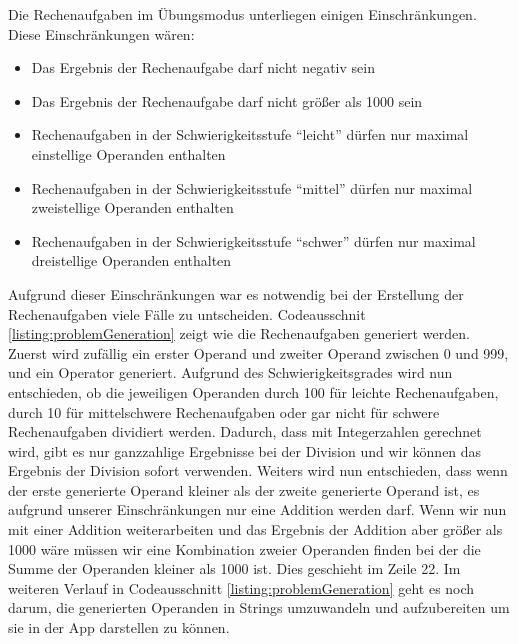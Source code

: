 Die Rechenaufgaben im Übungsmodus unterliegen einigen Einschränkungen. Diese Einschränkungen wären:
\begin{itemize}
\item Das Ergebnis der Rechenaufgabe darf nicht negativ sein
\item Das Ergebnis der Rechenaufgabe darf nicht größer als 1000 sein
\item Rechenaufgaben in der Schwierigkeitsstufe \enquote{leicht} dürfen nur maximal einstellige Operanden enthalten
\item Rechenaufgaben in der Schwierigkeitsstufe \enquote{mittel} dürfen nur maximal zweistellige Operanden enthalten
\item Rechenaufgaben in der Schwierigkeitsstufe \enquote{schwer} dürfen nur maximal dreistellige Operanden enthalten
\end{itemize}
Aufgrund dieser Einschränkungen war es notwendig bei der Erstellung der Rechenaufgaben viele 
Fälle zu untscheiden. Codeausschnit \ref{listing:problemGeneration} zeigt wie die Rechenaufgaben
generiert werden.
Zuerst wird zufällig ein erster Operand und zweiter Operand zwischen 0 und 999, und ein Operator 
generiert. Aufgrund des Schwierigkeitsgrades wird nun entschieden, ob die jeweiligen Operanden durch
100 für leichte Rechenaufgaben, durch 10 für mittelschwere Rechenaufgaben oder gar nicht für schwere
Rechenaufgaben dividiert werden. Dadurch, dass mit Integerzahlen gerechnet wird, gibt es nur ganzzahlige
Ergebnisse bei der Division und wir können das Ergebnis der Division sofort verwenden.
Weiters wird nun entschieden, dass wenn der erste generierte Operand kleiner als der zweite generierte Operand 
ist, es aufgrund unserer Einschränkungen nur eine Addition werden darf. Wenn wir nun mit einer 
Addition weiterarbeiten und das Ergebnis der Addition aber größer als 1000 wäre müssen wir eine Kombination 
zweier Operanden finden bei der die Summe der Operanden kleiner als 1000 ist. Dies geschieht im Zeile 22.
Im weiteren Verlauf in Codeausschnitt \ref{listing:problemGeneration} geht es noch darum, die generierten
Operanden in Strings umzuwandeln und aufzubereiten um sie in der App darstellen zu können.


